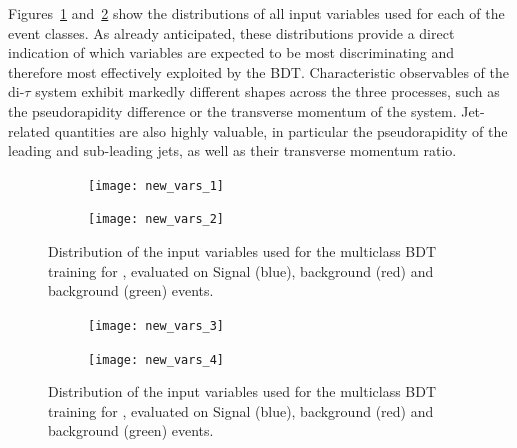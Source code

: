 Figures~\ref{tth_vars_tmva_1} and~\ref{tth_vars_tmva_2} show the distributions of all input variables used for each of the event classes. As already anticipated, these distributions provide a direct indication of which variables are expected to be most discriminating and therefore most effectively exploited by the BDT. Characteristic observables of the di-$\tau$ system exhibit markedly different shapes across the three processes, such as the pseudorapidity difference or the transverse momentum of the system. Jet-related quantities are also highly valuable, in particular the pseudorapidity of the leading and sub-leading jets, as well as their transverse momentum ratio.

\begin{figure}[htbp]
    \centering
    \begin{subfigure}{0.95\linewidth}
      \centering
      \texttt{[image: new\_vars\_1]}
    \end{subfigure}
    \vspace{0.5cm} %
    \begin{subfigure}{0.95\linewidth}
      \centering
      \texttt{[image: new\_vars\_2]}
    \end{subfigure}
    \caption{Distribution of the input variables used for the multiclass BDT training for \ttHtt, evaluated on Signal (blue), \ztautau background (red) and \ttbar background (green) events.}
    \label{tth_vars_tmva_1}
  \end{figure}

  \begin{figure}[htbp]
    \centering
    \begin{subfigure}{0.95\linewidth}
      \centering
      \texttt{[image: new\_vars\_3]}
    \end{subfigure}
    \vspace{0.5cm} %
    \begin{subfigure}{0.95\linewidth}
      \centering
      \texttt{[image: new\_vars\_4]}
    \end{subfigure}
    \caption{Distribution of the input variables used for the multiclass BDT training for \ttHtt, evaluated on Signal (blue), \ztautau background (red) and \ttbar background (green) events.}
    \label{tth_vars_tmva_2}
  \end{figure}


